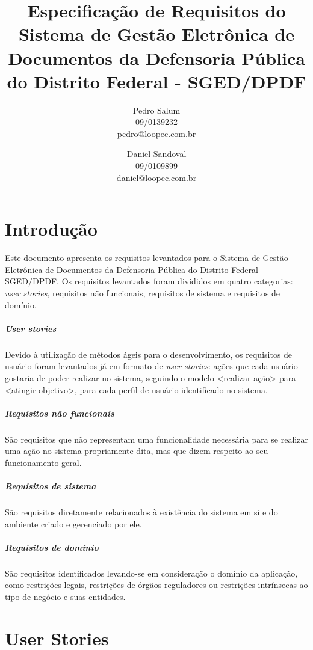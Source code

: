 \documentclass[12pt,a4paper]{report}
\title{Especificação de Requisitos do Sistema de Gestão Eletrônica de Documentos da Defensoria Pública do Distrito Federal - SGED/DPDF}
\author{Pedro Salum\\
	09/0139232\\
	pedro@loopec.com.br
	\and
	Daniel Sandoval\\
	09/0109899\\
	daniel@loopec.com.br}
\begin{document}
\maketitle
\tableofcontents

\chapter{Introdução}

Este documento apresenta os requisitos levantados para o Sistema de Gestão Eletrônica de Documentos da Defensoria Pública do Distrito Federal - SGED/DPDF. Os requisitos levantados foram divididos em quatro categorias: \textit{user stories}, requisitos não funcionais, requisitos de sistema e requisitos de domínio.

\paragraph{\textit{User stories}} Devido à utilização de métodos ágeis para o desenvolvimento, os requisitos de usuário foram levantados já em formato de \textit{user stories}: ações que cada usuário gostaria de poder realizar no sistema, seguindo o modelo <realizar ação> para <atingir objetivo>, para cada perfil de usuário identificado no sistema.

\paragraph{Requisitos não funcionais} São requisitos que não representam uma funcionalidade necessária para se realizar uma ação no sistema propriamente dita, mas que dizem respeito ao seu funcionamento geral.

\paragraph{Requisitos de sistema} São requisitos diretamente relacionados à existência do sistema em si e do ambiente criado e gerenciado por ele.

\paragraph{Requisitos de domínio} São requisitos identificados levando-se em consideração o domínio da aplicação, como restrições legais, restrições de órgãos reguladores ou restrições intrínsecas ao tipo de negócio e suas entidades.

\chapter{User Stories}
\end{document}
